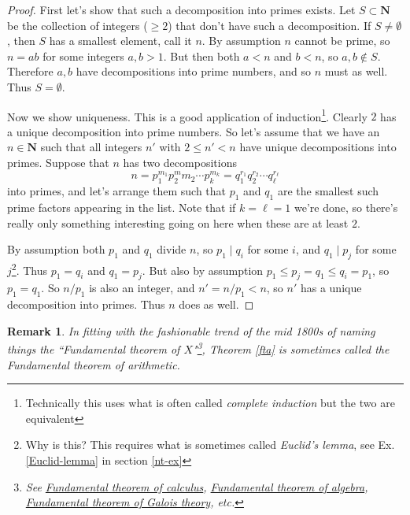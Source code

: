 \documentclass[12pt]{article}
\numberwithin{equation}{subsection}
\theoremstyle{note}
\newtheorem{remark}[subsection]{Remark}
\begin{document}
\begin{proof} First let's show that such a decomposition into primes exists. Let $S\subset \mathbf{N}$ be the collection of integers ($\geq 2$) that don't have such a decomposition. If $S\neq \emptyset$, then $S$ has a smallest element, call it $n$. By assumption $n$ cannot be prime, so $n=ab$ for some integers $a,b>1$. But then both $a<n$ and $b<n$, so $a,b\notin S$. Therefore $a,b$ have decompositions into prime numbers, and so $n$ must as well. Thus $S=\emptyset$. 

Now we show uniqueness. This is a good application of induction\footnote{Technically this uses what is often called \textit{complete induction} but the two are equivalent}. Clearly $2$ has a unique decomposition into prime numbers. So let's assume that we have an $n\in\mathbf{N}$ such that all integers $n'$ with $2\leq n'<n$ have unique decompositions into primes. Suppose that $n$ has two decompositions \[ n=p_1^{m_1}p_2^m{m_2}\cdots p_k^{m_k}=q_1^{r_1}q_2^{r_2}\cdots q_{\ell}^{r_{\ell}}\] into primes, and let's arrange them such that $p_1$ and $q_1$ are the smallest such prime factors appearing in the list. Note that if $k=\ell=1$ we're done, so there's really only something interesting going on here when these are at least $2$.  

By assumption both $p_1$ and $q_1$ divide $n$, so $p_1\mid q_i$ for some $i$, and $q_1\mid p_j$ for some $j$\footnote{Why is this? This requires what is sometimes called \textit{Euclid's lemma}, see Ex. \ref{Euclid-lemma} in section \ref{nt-ex}}. Thus $p_1=q_i$ and $q_1=p_j$. But also by assumption $p_1\leq p_j =q_1\leq q_i=p_1$, so $p_1=q_1$. So $n/p_1$ is also an integer, and $n'=n/p_1<n$, so $n'$ has a unique decomposition into primes. Thus $n$ does as well. 
\end{proof}

\begin{remark}
In fitting with the fashionable trend of the mid 1800s of naming things the ``Fundamental theorem of $X$"\footnote{See \href{https://en.wikipedia.org/wiki/Fundamental_theorem_of_calculus}{Fundamental theorem of calculus}, \href{https://en.wikipedia.org/wiki/Fundamental_theorem_of_algebra}{Fundamental theorem of algebra}, \href{https://en.wikipedia.org/wiki/Fundamental_theorem_of_Galois_theory}{Fundamental theorem of Galois theory}, etc.}, Theorem \ref{fta} is sometimes called the \textit{Fundamental theorem of arithmetic}.

\end{remark}
\end{document}
